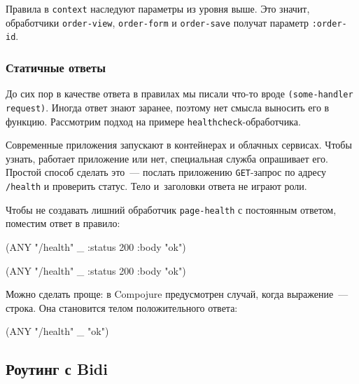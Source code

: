 \fi

Правила в \verb|context| наследуют параметры из уровня выше. Это значит,
обработчики \texttt{order\--view}, \texttt{order\--form} и \texttt{order\--save}
получат параметр \verb|:order-id|.

\subsubsection*{Статичные ответы}

До сих пор в качестве ответа в правилах мы писали что-то вроде
\verb|(some-handler request)|. Иногда ответ знают заранее, поэтому нет смысла
выносить его в функцию. Рассмотрим подход на примере
\verb|healthcheck|-обработчика.

Современные приложения запускают в контейнерах и облачных сервисах. Чтобы
узнать, работает приложение или нет, специальная служба опрашивает его. Простой
способ сделать это~--- послать приложению \verb|GET|-запрос по адресу
\verb|/health| и проверить статус. Тело и~заголовки ответа не играют роли.

Чтобы не создавать лишний обработчик \texttt{page\--health} с постоянным ответом,
поместим ответ в правило:


\ifnarrow

\begin{english}
  \begin{clojure}
(ANY "/health" _
     {:status 200 :body "ok"})
  \end{clojure}
\end{english}

\else

\begin{english}
  \begin{clojure}
(ANY "/health" _ {:status 200 :body "ok"})
  \end{clojure}
\end{english}

\fi

Можно сделать проще: в Compojure предусмотрен случай, когда выражение~---
строка. Она становится телом положительного ответа:

\begin{english}
  \begin{clojure}
(ANY "/health" _ "ok")
  \end{clojure}
\end{english}

\subsection{Роутинг с Bidi}

